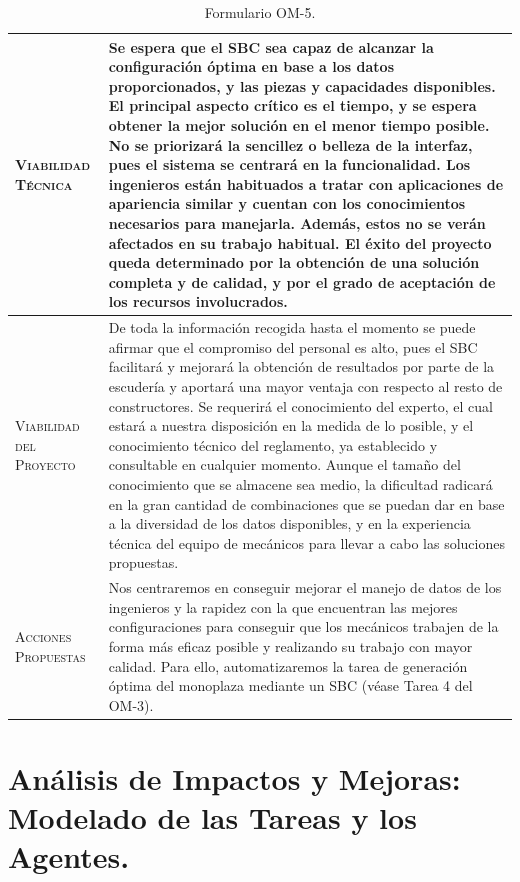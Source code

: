\documentclass[12pt,a4paper,twoside,spanish]{article}      %
\begin{document}
\begin{table}[H]
\begin{tabularx}{\textwidth}{|l|X|}
\textsc{Viabilidad Técnica} & 
Se espera que el SBC sea capaz de alcanzar la configuración óptima en base a los datos proporcionados, y las piezas y capacidades disponibles. El principal aspecto crítico es el tiempo, y se espera obtener la mejor solución en el menor tiempo posible. No se priorizará la sencillez o belleza de la interfaz, pues el sistema se centrará en la funcionalidad. Los ingenieros están habituados a tratar con aplicaciones de apariencia similar y cuentan con los conocimientos necesarios para manejarla. Además, estos no se verán afectados en su trabajo habitual. El éxito del proyecto queda determinado por la obtención de una solución completa y de calidad, y por el grado de aceptación de los recursos involucrados. \\ \hline

\textsc{Viabilidad del Proyecto} & 
De toda la información recogida hasta el momento se puede afirmar que el compromiso del personal es alto, pues el SBC facilitará y mejorará la obtención de resultados por parte de la escudería y aportará una mayor ventaja con respecto al resto de constructores. Se requerirá el conocimiento del experto, el cual estará a nuestra disposición en la medida de lo posible, y el conocimiento técnico del reglamento, ya establecido y consultable en cualquier momento. Aunque el tamaño del conocimiento que se almacene sea medio, la dificultad radicará en la gran cantidad de combinaciones que se puedan dar en base a la diversidad de los datos disponibles, y en la experiencia técnica del equipo de mecánicos para llevar a cabo las soluciones propuestas.  \\ \hline



\textsc{Acciones Propuestas} & 
Nos centraremos en conseguir mejorar el manejo de datos de los ingenieros y la rapidez con la que encuentran las mejores configuraciones para conseguir que los mecánicos trabajen de la forma más eficaz posible y realizando su trabajo con mayor calidad. Para ello, automatizaremos la tarea de generación óptima del monoplaza mediante un SBC (véase Tarea 4 del OM-3). \\ \hline
\end{tabularx}
\caption{Formulario OM-5.}
  \label{tab.OM5_2}
\end{table}


\pagebreak
\section{Análisis de Impactos y Mejoras: Modelado de las Tareas y los Agentes.}
\end{document}
